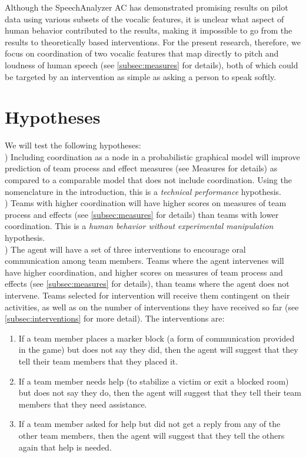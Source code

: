Although the SpeechAnalyzer AC has demonstrated promising results on pilot data
using various subsets of the vocalic features, it is unclear what aspect of
human behavior contributed to the results, making it impossible to go from the
results to theoretically based interventions. For the present research,
therefore, we focus on coordination of two vocalic features that map directly
to pitch and loudness of human speech (see \autoref{subsec:measures} for
details), both of which could be targeted by an intervention as simple as
asking a person to speak softly.

\section{Hypotheses}

We will test the following hypotheses:\\

) Including coordination as a node in a probabilistic graphical
model will improve prediction of team process and effect measures (see Measures
for details)  as compared to a comparable model that does not include
coordination. Using the nomenclature in the introduction, this is a
\textit{technical performance} hypothesis.\\

) Teams with higher coordination will have higher scores on measures
of team process and effects (see \autoref{subsec:measures} for details) than
teams with lower coordination. This is a
\textit{human behavior without experimental manipulation} hypothesis. \\

) The agent will have a set of three interventions to encourage oral
communication among team members. Teams where the agent intervenes will have
higher coordination, and higher scores on measures of team process and effects
(see \autoref{subsec:measures} for details), than teams where the agent does
not intervene.  Teams selected for intervention will receive them contingent on
their activities, as well as on the number of interventions they have received
so far (see \autoref{subsec:interventions} for more detail).  The interventions
are:

\begin{enumerate}
    \item If a team member places a marker block (a form of communication
        provided in the game) but does not say they did, then the agent
        will suggest that they tell their team members that they placed it.

    \item If a team member needs help (to stabilize a
        victim or exit a blocked room) but does not say they do, then the
        agent will suggest that they tell their team members that they need
        assistance.

    \item If a team member asked for help but did not get a
        reply from any of the other team members, then the agent will
        suggest that they tell the others again that help is needed.
\end{enumerate}

